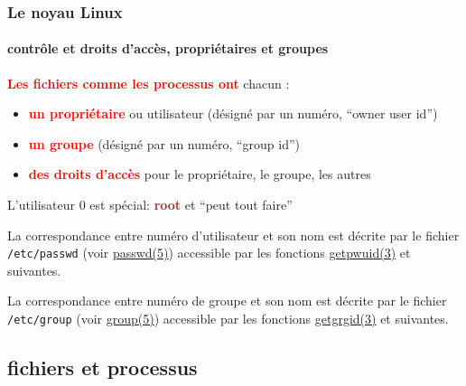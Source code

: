 \documentclass[xcolor=svgnames,final,smaller,a4]{beamer}
\begin{document}
\begin{frame}
  \frametitle{Le noyau Linux}
  \framesubtitle{contrôle et droits d'accès, propriétaires et groupes}

   \textbf{\textcolor{red}{Les fichiers comme les processus ont}} chacun :

  \begin{itemize}

  \item \textbf{\textcolor{red}{un propriétaire}} ou utilisateur (désigné par un numéro, ``owner user id'')

  \item \textbf{\textcolor{red}{un groupe}} (désigné par un numéro, ``group id'')

  \item \textbf{\textcolor{red}{des droits d'accès}} pour le propriétaire, le groupe, les autres

  \end{itemize}

  L'utilisateur 0 est spécial: \textbf{\textcolor{brown}{root}} et ``peut tout faire''

\vspace{0.5cm}

  La correspondance entre numéro d'utilisateur et son nom est décrite
  par le fichier \texttt{/etc/passwd} (voir
  \href{https://man7.org/linux/man-pages/man5/passwd.5.html}{passwd(5)})
  accessible par les fonctions
  \href{https://man7.org/linux/man-pages/man3/getpwuid.3.html}{getpwuid(3)}
  et suivantes.
  
  La correspondance entre numéro de groupe et son nom est décrite
  par le fichier \texttt{/etc/group} (voir
  \href{https://man7.org/linux/man-pages/man5/group.5.html}{group(5)})
  accessible par les fonctions
  \href{https://man7.org/linux/man-pages/man3/getgrgid.3.html}{getgrgid(3)}
  et suivantes.
  
\end{frame}

\subsection{fichiers et processus}
\end{document}
